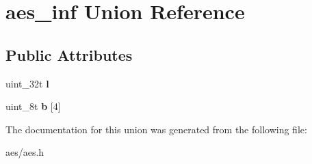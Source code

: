 \hypertarget{unionaes__inf}{}\section{aes\+\_\+inf Union Reference}
\label{unionaes__inf}
\subsection*{Public Attributes}
\begin{DoxyCompactItemize}
\item 
uint\+\_\+32t {\bfseries l}\hypertarget{unionaes__inf_a2ec5152de610d6be8f6eafc393caddb4}{}\label{unionaes__inf_a2ec5152de610d6be8f6eafc393caddb4}

\item 
uint\+\_\+8t {\bfseries b} \mbox{[}4\mbox{]}\hypertarget{unionaes__inf_ad5285b6e67b11f4575e3cc83bee9ac31}{}\label{unionaes__inf_ad5285b6e67b11f4575e3cc83bee9ac31}

\end{DoxyCompactItemize}


The documentation for this union was generated from the following file\+:\begin{DoxyCompactItemize}
\item 
aes/aes.\+h\end{DoxyCompactItemize}
